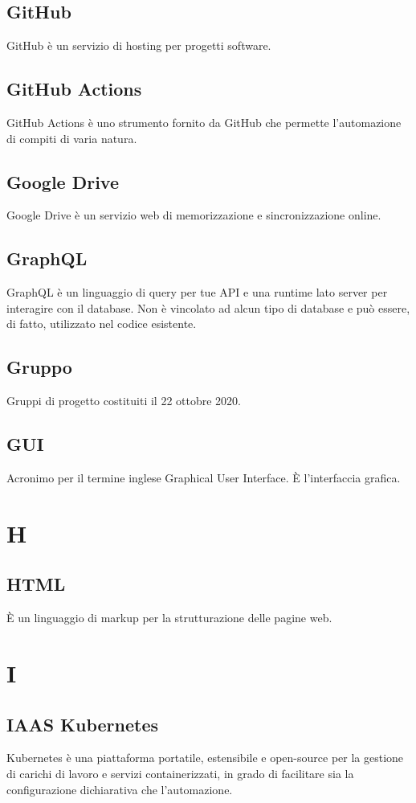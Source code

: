 \subsection{GitHub} GitHub è un servizio di hosting per progetti software.
\subsection{GitHub Actions} GitHub Actions è uno strumento fornito da GitHub che permette l’automazione di compiti di varia natura.
\subsection{Google Drive} Google Drive è un servizio web di memorizzazione e sincronizzazione online.
\subsection{GraphQL} GraphQL è un linguaggio di query per tue API e una runtime lato server per interagire con il database. Non è vincolato ad alcun tipo di database e può essere, di fatto, utilizzato nel codice esistente.
\subsection{Gruppo} Gruppi di progetto costituiti il 22 ottobre 2020.
\subsection{GUI} Acronimo per il termine inglese Graphical User Interface. È l'interfaccia grafica.
\newpage \section{H}
\subsection{HTML} È un linguaggio di markup per la strutturazione delle pagine web.
\newpage \section{I}
\subsection{IAAS Kubernetes} Kubernetes è una piattaforma portatile, estensibile e open-source per la gestione di carichi di lavoro e servizi containerizzati, in grado di facilitare sia la configurazione dichiarativa che l'automazione.
